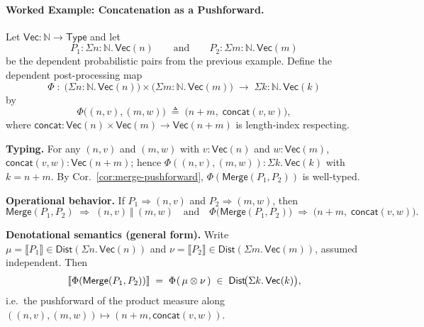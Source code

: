 \documentclass{article}
\begin{document}
\paragraph{Worked Example: Concatenation as a Pushforward.}

Let $\mathsf{Vec}:\mathbb{N}\to\mathsf{Type}$ and let
\[
P_1 : \Sigma n:\mathbb{N}.\,\mathsf{Vec}(n)
\qquad\text{and}\qquad
P_2 : \Sigma m:\mathbb{N}.\,\mathsf{Vec}(m)
\]
be the dependent probabilistic pairs from the previous example. Define the
dependent post-processing map
\[
\Phi \;:\;
\big(\Sigma n:\mathbb{N}.\,\mathsf{Vec}(n)\big)
\times
\big(\Sigma m:\mathbb{N}.\,\mathsf{Vec}(m)\big)
\;\longrightarrow\;
\Sigma k:\mathbb{N}.\,\mathsf{Vec}(k)
\]
by
\[
\Phi\big((n,v),(m,w)\big) \;\triangleq\; \big(n{+}m,\;\mathsf{concat}(v,w)\big),
\]
where $\mathsf{concat}:\mathsf{Vec}(n)\times\mathsf{Vec}(m)\to\mathsf{Vec}(n{+}m)$
is length-index respecting.

\medskip
\textbf{Typing.}
For any $(n,v)$ and $(m,w)$ with $v:\mathsf{Vec}(n)$ and $w:\mathsf{Vec}(m)$,
$\mathsf{concat}(v,w):\mathsf{Vec}(n{+}m)$; hence
$\Phi((n,v),(m,w)):\Sigma k.\,\mathsf{Vec}(k)$ with $k=n{+}m$.
By Cor.~\ref{cor:merge-pushforward}, $\Phi(\mathsf{Merge}(P_1,P_2))$ is
well-typed.

\medskip
\textbf{Operational behavior.}
If $P_1 \Rightarrow (n,v)$ and $P_2 \Rightarrow (m,w)$, then
\[
\mathsf{Merge}(P_1,P_2) \;\Rightarrow\; (n,v)\ \Vert\ (m,w)
\quad\text{and}\quad
\Phi\big(\mathsf{Merge}(P_1,P_2)\big)\;\Rightarrow\; \big(n{+}m,\;\mathsf{concat}(v,w)\big).
\]

\medskip
\textbf{Denotational semantics (general form).}
Write $\mu=\llbracket P_1 \rrbracket \in \mathsf{Dist}(\Sigma n.\,\mathsf{Vec}(n))$
and $\nu=\llbracket P_2 \rrbracket \in \mathsf{Dist}(\Sigma m.\,\mathsf{Vec}(m))$,
assumed independent. Then
\[
\llbracket \Phi(\mathsf{Merge}(P_1,P_2)) \rrbracket
\;=\;
\Phi_{\*}(\,\mu \otimes \nu\,)
\;\in\; \mathsf{Dist}\!\big(\Sigma k.\,\mathsf{Vec}(k)\big),
\]
i.e.\ the pushforward of the product measure along
$((n,v),(m,w)) \mapsto (n{+}m,\mathsf{concat}(v,w))$.
\end{document}
